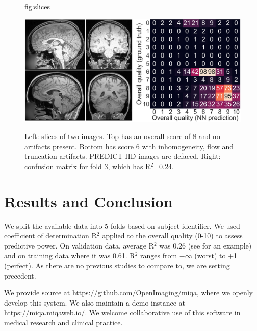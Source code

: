 \documentclass{midl} %
\begin{document}
\begin{figure}[ptb] %
\floatconts
  {fig:slices}
  {\caption{Left: slices of two images. Top has an overall score of 8 and no artifacts present. Bottom has score 6 with inhomogeneity, flow and truncation artifacts. PREDICT-HD images are defaced. Right: confusion matrix for fold 3, which has R$^2$=0.24.}}
  {
  \includegraphics[width=0.99\linewidth]{figure.png}
  \vspace{-1.5\baselineskip} %
  }
\end{figure}

\section{Results and Conclusion}

We split the available data into 5 folds based on subject identifier. We used \href{https://en.wikipedia.org/wiki/Coefficient_of_determination}{coefficient of determination} R$^2$ applied to the overall quality (0-10) to assess predictive power. On validation data, average R$^2$ was 0.26 (see  for an example) and on training data where it was 0.61. R$^2$ ranges from $-\infty$ (worst) to +1 (perfect).
As there are no previous studies to compare to, we are setting precedent.

We provide source at \url{https://github.com/OpenImaging/miqa}, where we openly develop this system. We also maintain a demo instance at \url{https://miqa.miqaweb.io/}.
We welcome collaborative use of this software in medical research and clinical practice.



\end{document}
